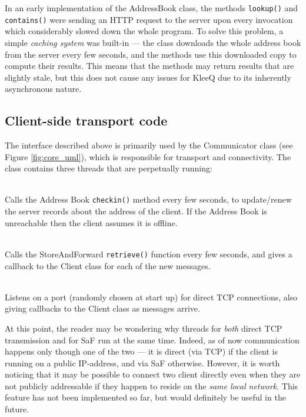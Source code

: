 \documentclass[a4paper, 12pt]{report}
\begin{document}
In an early implementation of the AddressBook class, the methods \texttt{lookup()} and \texttt{contains()} were sending an HTTP request to the server upon every invocation which considerably slowed down the whole program. To solve this problem, a simple \emph{caching system} was built-in --- the class downloads the whole address book from the server every few seconds, and the methods use this downloaded copy to compute their results. This means that the methods may return results that are slightly stale, but this does not cause any issues for KleeQ due to its inherently asynchronous nature. \\


\subsection{Client-side transport code}
\label{subsec:impl.prep.transport}
The interface described above is primarily used by the Communicator class (see Figure \ref{fig:core_uml}), which is responsible for transport and connectivity. The class contains three threads that are perpetually running:
\begin{description}[labelindent=0.5cm, leftmargin=1.3cm, rightmargin=0.5cm]
    \item[Address-reporting thread] \hfill \\
        Calls the Address Book \texttt{checkin()} method every few seconds, to update/renew the server records about the address of the client. If the Address Book is unreachable then the client assumes it is offline.
    \item[SaF Querying Thread] \hfill \\
        Calls the StoreAndForward \texttt{retrieve()} function every few seconds, and gives a callback to the Client class for each of the new messages.
    \item[TCP Socket Server Thread] \hfill \\
        Listens on a port (randomly chosen at start up) for direct TCP connections, also giving callbacks to the Client class as messages arrive.
\end{description}
At this point, the reader may be wondering why threads for \emph{both} direct TCP transmission and for SaF run at the same time. Indeed, as of now communication happens only though one of the two --- it is direct (via TCP) if the client is running on a public IP-address, and via SaF otherwise. However, it is worth noticing that it may be possible to connect two client directly even when they are not publicly addressable if they happen to reside on the \emph{same local network}. This feature has not been implemented so far, but would definitely be useful in the future. \\
\end{document}
